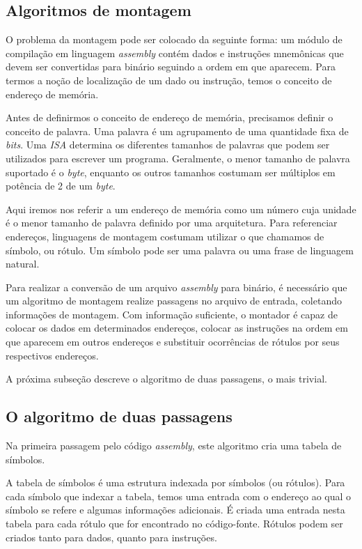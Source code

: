 \subsection{Algoritmos de montagem}

O problema da montagem pode ser colocado da seguinte forma: um módulo de compilação em linguagem \textit{assembly} contém dados e instruções mnemônicas que devem ser convertidas para binário seguindo a ordem em que aparecem. Para termos a noção de localização de um dado ou instrução, temos o conceito de endereço de memória.

Antes de definirmos o conceito de endereço de memória, precisamos definir o conceito de palavra. Uma palavra é um agrupamento de uma quantidade fixa de \textit{bits}. Uma \textit{ISA} determina os diferentes tamanhos de palavras que podem ser utilizados para escrever um programa. Geralmente, o menor tamanho de palavra suportado é o \textit{byte}, enquanto os outros tamanhos costumam ser múltiplos em potência de 2 de um \textit{byte}.

Aqui iremos nos referir a um endereço de memória como um número cuja unidade é o menor tamanho de palavra definido por uma arquitetura. Para referenciar endereços, linguagens de montagem costumam utilizar o que chamamos de símbolo, ou rótulo. Um símbolo pode ser uma palavra ou uma frase de linguagem natural.

Para realizar a conversão de um arquivo \textit{assembly} para binário, é necessário que um algoritmo de montagem realize passagens no arquivo de entrada, coletando informações de montagem. Com informação suficiente, o montador é capaz de colocar os dados em determinados endereços, colocar as instruções na ordem em que aparecem em outros endereços e substituir ocorrências de rótulos por seus respectivos endereços.

A próxima subseção descreve o algoritmo de duas passagens, o mais trivial.

\subsection{O algoritmo de duas passagens}

Na primeira passagem pelo código \textit{assembly}, este algoritmo cria uma tabela de símbolos.

A tabela de símbolos é uma estrutura indexada por símbolos (ou rótulos). Para cada símbolo que indexar a tabela, temos uma entrada com o endereço ao qual o símbolo se refere e algumas informações adicionais. É criada uma entrada nesta tabela para cada rótulo que for encontrado no código-fonte. Rótulos podem ser criados tanto para dados, quanto para instruções.

